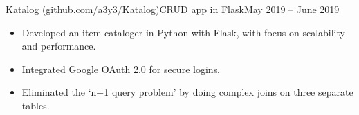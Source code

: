 \begin{cvsubsection}{Katalog \normalfont(\href{ https://github.com/a3y3/Katalog}{\normalfont github.com/a3y3/Katalog})}{CRUD app in Flask}{May 2019 -- June 2019}
	\begin{itemize}
		\item Developed an item cataloger in Python with Flask, with focus on scalability and performance.
		\item Integrated Google OAuth 2.0 for secure logins.
		\item Eliminated the ‘n+1 query problem’ by doing complex joins on three separate tables.
	\end{itemize}
\end{cvsubsection}